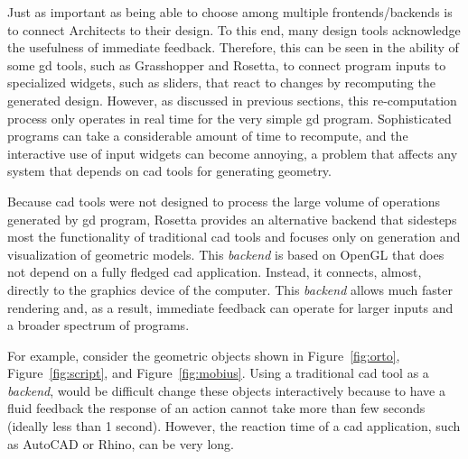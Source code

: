 Just as important as being able to choose among multiple frontends/backends is to connect Architects to their design. To this end, many design tools acknowledge the usefulness of immediate feedback. Therefore, this can be seen in the ability of some \gls{gd} tools, such as Grasshopper and Rosetta, to connect program inputs to specialized widgets, such as sliders, that react to changes by recomputing the generated design. However, as discussed in previous sections, this re-computation process only operates in real time for the very simple \gls{gd} program. Sophisticated programs can take a considerable amount of time to recompute, and the interactive use of input widgets can become annoying, a problem that affects any system that depends on \gls{cad} tools for generating geometry.

Because \gls{cad} tools were not designed to process the large volume of operations generated by \gls{gd} program, Rosetta provides an alternative backend that sidesteps most the functionality of traditional \gls{cad} tools and focuses only on generation and visualization of geometric models. This \textit{backend} is based on OpenGL that does not depend on a fully fledged \gls{cad} application. Instead, it connects, almost, directly to the graphics device of the computer. This \textit{backend} allows much faster rendering and, as a result, immediate feedback can operate for larger inputs and a broader spectrum of programs. 

For example, consider the geometric objects shown in Figure~\ref{fig:orto}, Figure~\ref{fig:script}, and Figure~\ref{fig:mobius}. Using a traditional \gls{cad} tool as a \textit{backend}, would be difficult change these objects interactively because to have a fluid feedback the response of an action cannot take more than few seconds (ideally less than 1 second). However, the reaction time of a \gls{cad} application, such as AutoCAD or Rhino, can be very long. 

